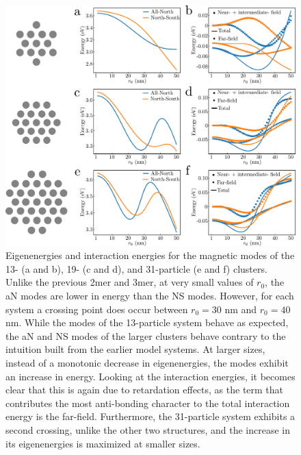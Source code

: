 \documentclass[journal=apchd5,manuscript=article]{achemso}
\begin{document}
\begin{figure}
\includegraphics{13_19_31_eigen.pdf}
\caption{Eigenenergies and interaction energies for the magnetic modes of the 13- (a and b), 19- (c and d), and 31-particle (e and f) clusters. Unlike the previous 2mer and 3mer, at very small values of $r_0$, the aN modes are lower in energy than the NS modes. However, for each system a crossing point does occur between $r_0 = 30$ nm and $r_0 = 40$ nm. While the modes of the 13-particle system behave as expected, the aN and NS modes of the larger clusters behave contrary to the intuition built from the earlier model systems. At larger sizes, instead of a monotonic decrease in eigenenergies, the modes exhibit an increase in energy. Looking at the interaction energies, it becomes clear that this is again due to retardation effects, as the term that contributes the most anti-bonding character to the total interaction energy is the far-field. Furthermore, the 31-particle system exhibits a second crossing, unlike the other two structures, and the increase in its eigenenergies is maximized at smaller sizes.}
\label{kagan_eigen}
\end{figure}
\end{document}
